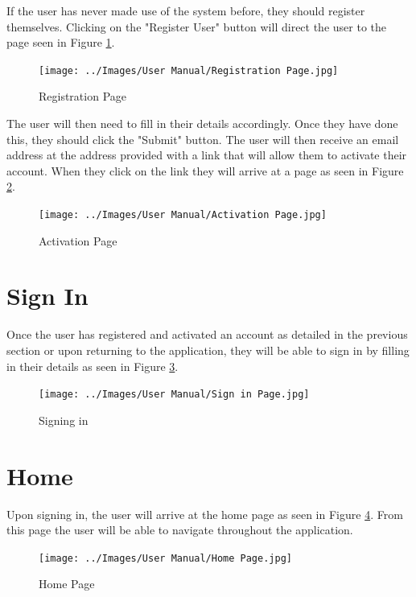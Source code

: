 \documentclass[11pt,a4paper]{article}
\begin{document}
If the user has never made use of the system before, they should register themselves. Clicking on the "Register User"
button will direct the user to the page seen in Figure \ref{fig:regPage}.
\begin{figure}[H]
	\begin{center}
		\texttt{[image: ../Images/User Manual/Registration Page.jpg]}
		\caption{Registration Page}
		\label{fig:regPage}
	\end{center}  
\end{figure}

The user will then need to fill in their details accordingly. Once they have done this, they should click the "Submit" 
button. The user will then receive an email address at the address provided with a link that will allow them to activate
their account. When they click on the link they will arrive at a page as seen in Figure \ref{fig:activatePage}.
\begin{figure}[H]
	\begin{center}
		\texttt{[image: ../Images/User Manual/Activation Page.jpg]}
		\caption{Activation Page}
		\label{fig:activatePage}
	\end{center}  
\end{figure}

\section{Sign In}
Once the user has registered and activated an account as detailed in the previous section or upon returning to the application,
they will be able to sign in by filling in their details as seen in Figure \ref{fig:signPage}.
\begin{figure}[H]
	\begin{center}
		\texttt{[image: ../Images/User Manual/Sign in Page.jpg]}
		\caption{Signing in}
		\label{fig:signPage}
	\end{center}  
\end{figure}

\section{Home}
Upon signing in, the user will arrive at the home page as seen in Figure \ref{fig:homePage}. From this page the user will be able 
to navigate throughout the application.
\begin{figure}[H]
	\begin{center}
		\texttt{[image: ../Images/User Manual/Home Page.jpg]}
		\caption{Home Page}
		\label{fig:homePage}
	\end{center}  
\end{figure}
\end{document}
